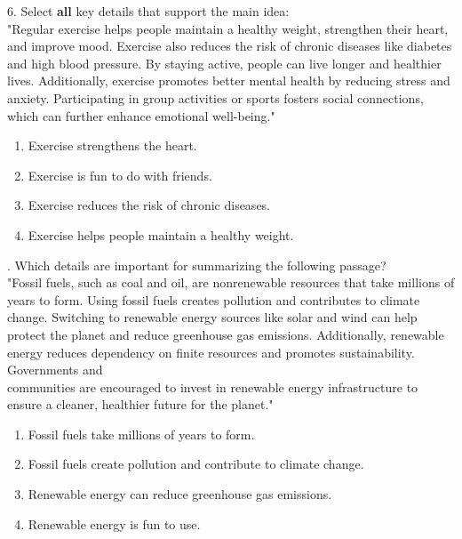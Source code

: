 \documentclass[12pt]{article}
\begin{document}
6. Select \textbf{all} key details that support the main idea: \\
"Regular exercise helps people maintain a healthy weight, strengthen their heart, and improve mood. Exercise also reduces the risk of chronic diseases like diabetes and high blood pressure. By staying active, people can live longer and healthier lives. Additionally, exercise promotes better mental health by reducing stress and anxiety. Participating in group activities or sports fosters social connections, which can further enhance emotional well-being."\\
\begin{enumerate}[label=\Alph*.]
    \item Exercise strengthens the heart.  
    \item Exercise is fun to do with friends.  
    \item Exercise reduces the risk of chronic diseases.  
    \item Exercise helps people maintain a healthy weight.  
\end{enumerate}

\vspace{1em}
. Which details are important for summarizing the following passage?\\
"Fossil fuels, such as coal and oil, are nonrenewable resources that take millions of years to form. Using fossil fuels creates pollution and contributes to climate change. Switching to renewable energy sources like solar and wind can help protect the planet and reduce greenhouse gas emissions. Additionally, renewable energy reduces dependency on finite resources and promotes sustainability. Governments and \\communities are encouraged to invest in renewable energy infrastructure to ensure a cleaner, healthier future for the planet."\\
\begin{enumerate}[label=\Alph*.]
    \item Fossil fuels take millions of years to form.  
    \item Fossil fuels create pollution and contribute to climate change.  
    \item Renewable energy can reduce greenhouse gas emissions.  
    \item Renewable energy is fun to use.  
\end{enumerate}

\vspace{1cm}
\end{document}
